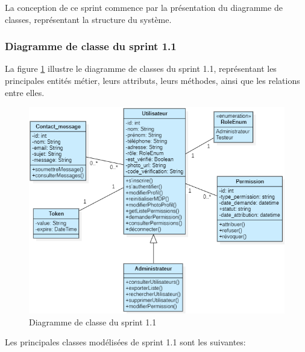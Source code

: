 La conception de ce sprint commence par la présentation du diagramme de classes, représentant la structure du système.
\subsubsection{Diagramme de classe du sprint 1.1}
La figure \ref{fig:classsp1} illustre le diagramme de classes du sprint 1.1, représentant les principales entités métier, leurs attributs, leurs méthodes, ainsi que les relations entre elles.
\begin{figure}[H]
    \centering
    \includegraphics[width=0.9\linewidth]{chapitres/ch3Sp1/section/sprint1/img/classeL1-SP1.1.png}
    \caption{Diagramme de classe du sprint 1.1}
    \label{fig:classsp1}
\end{figure}
\vspace{-0.4cm}
Les principales classes modélisées de sprint 1.1 sont les suivantes:
